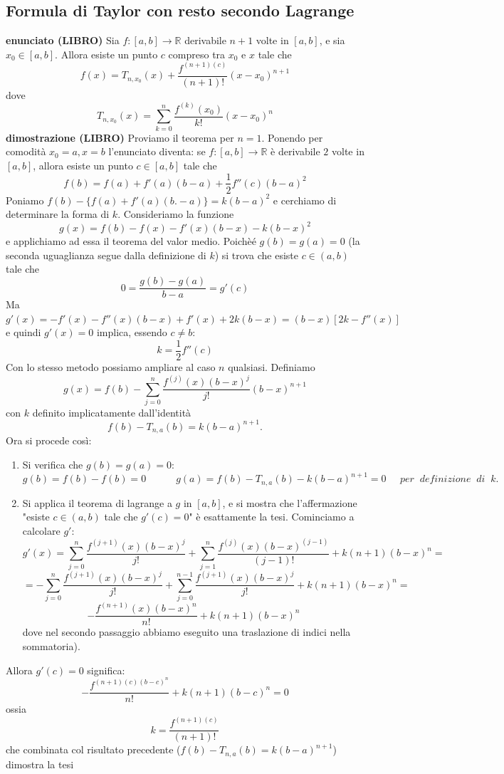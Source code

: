 \documentclass[a4paper, 9pt]{report}
\begin{document}
\subsection*{Formula di Taylor con resto secondo Lagrange}
\textbf{enunciato (LIBRO)}\newline
Sia $f:[a,b] \rightarrow \mathbb{R}$ derivabile $n+1$ volte in $[a,b]$, e sia $x_0 \in [a,b]$. Allora esiste un punto $c$ compreso tra $x_0$ e $x$ tale che
\[
    f(x) = T_{n,x_0}(x) + \frac{f^{(n+1)(c)}}{(n+1)!}(x-x_0)^{n+1}
\]
dove
\[
    T_{n,x_0}(x) = \sum_{k=0}^{n}\frac{f^{(k)}(x_0)}{k!}(x-x_0)^n
\]
\textbf{dimostrazione (LIBRO)}\newline
Proviamo il teorema per $n=1$. Ponendo per comodità $x_0 = a, x =b$ l'enunciato diventa: se $f : [a,b] \rightarrow \mathbb{R}$ è derivabile $2$ volte in $[a,b]$, allora esiste un punto $c \in [a,b]$ tale che
\[
    f(b)=f(a) +f'(a)(b-a) + \frac{1}{2}f''(c)(b-a)^2
\]
Poniamo $f(b)- \{f(a) + f'(a)(b.-a)\} = k(b-a)^2$ e cerchiamo di determinare la forma di $k$.\newline
Consideriamo la funzione
\[
    g(x) = f(b) - f(x) -f'(x)(b-x) - k(b-x)^2
\]
e applichiamo ad essa il teorema del valor medio. Poichèé $g(b) = g(a) = 0$ (la seconda uguaglianza segue dalla definizione di $k$) si trova che esiste $c \in (a,b)$ tale che
\[
    0 = \frac{g(b) - g(a)}{b-a} = g'(c)
\]
Ma $g'(x) = - f'(x) - f''(x)(b-x) + f'(x) + 2k(b-x) = (b-x)[2k-f''(x)]$ e quindi $g'(x) = 0$ implica, essendo $c \neq b$:
\[
    k = \frac{1}{2}f''(c)
\]
Con lo stesso metodo possiamo ampliare al caso $n$ qualsiasi.\newline
Definiamo
\[
    g(x) = f(b) - \sum_{j=0}^{n}\frac{f^{(j)}(x)(b-x)^j}{j!}(b-x)^{n+1}
\]
con $k$ definito implicatamente dall'identità
\[
    f(b)-T_{n,a}(b) = k (b-a)^{n+1}.
\]
Ora si procede così:
\begin{enumerate}
    \item Si verifica che $g(b) = g(a) = 0$:
    \[
        g(b) = f(b) - f(b) = 0 \quad \quad \quad g(a) = f(b) - T_{n,a}(b) - k(b-a)^{n+1} = 0 \;\;\;\;\; per \;\; definizione \;\; di \;\; k.
    \]
    \item Si applica il teorema di lagrange a $g$ in $[a,b]$, e si mostra che l'affermazione "esiste $c \in (a,b)$ tale che $g'(c) = 0$" è esattamente la tesi. Cominciamo a calcolare $g'$:
    \[
        g'(x)= \sum_{j=0}^{n}\frac{f^{(j+1)}(x)(b-x)^j}{j!} + \sum_{j=1}^{n}\frac{f^{(j)}(x)(b-x)^{(j-1)}}{(j-1)!} + k(n+1)(b-x)^n =
    \]
    \[
        = - \sum_{j=0}^{n} \frac{f^{(j+1)}(x)(b-x)^j}{j!}+ \sum_{j=0}^{n-1} \frac{f^{(j+1)}(x)(b-x)^{j}}{j!} + k(n+1)(b-x)^n =
    \]
    \[
        - \frac{f^{(n+1)}(x)(b-x)^n}{n!}+ k(n+1)(b-x)^n
    \]
    dove nel secondo passaggio abbiamo eseguito una traslazione di indici nella sommatoria).\newline
\end{enumerate}
Allora $g'(c) = 0$ significa:
\[
    -\frac{f^{(n+1)(c)(b-c)^n}}{n!}+ k(n+1)(b-c)^n = 0
\]
ossia
\[
    k = \frac{f^{(n+1)(c)}}{(n+1)!}
\]
che combinata col risultato precedente ($f(b)-T_{n,a}(b) = k (b-a)^{n+1}$) dimostra la tesi
\end{document}
